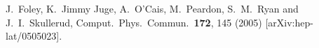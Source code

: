 \documentclass[a4paper]{article}
\begin{document}
\begin{thebibliography}{99}

  J.~Foley, K.~Jimmy Juge, A.~O'Cais, M.~Peardon, S.~M.~Ryan and J.~I.~Skullerud,
  Comput.\ Phys.\ Commun.\  {\bf 172}, 145 (2005)
  [arXiv:hep-lat/0505023].




\end{thebibliography}
\end{document}
